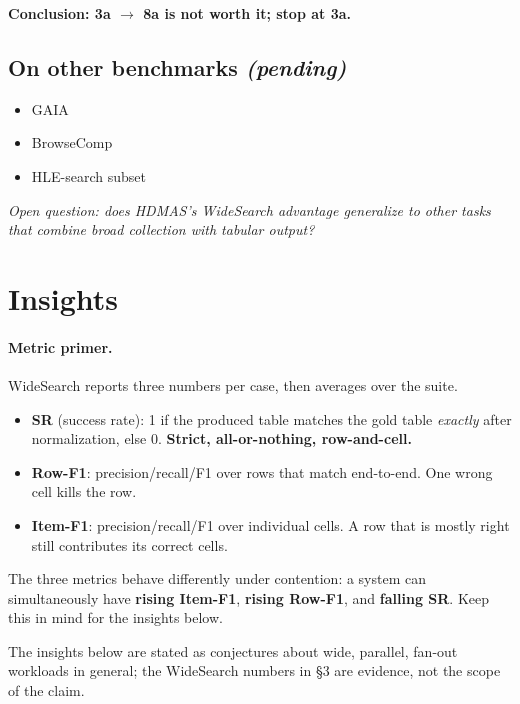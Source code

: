 \documentclass[11pt]{article}
\begin{document}
\textbf{Conclusion: 3a $\to$ 8a is not worth it; stop at 3a.}

\subsection{On other benchmarks \emph{(pending)}}

\begin{itemize}[leftmargin=1.2em]
  \item[$\square$] GAIA
  \item[$\square$] BrowseComp
  \item[$\square$] HLE-search subset
\end{itemize}

\noindent\emph{Open question: does HDMAS's WideSearch advantage generalize to other tasks that combine broad collection with tabular output?}

\section{Insights}

\paragraph{Metric primer.} WideSearch reports three numbers per case, then averages over the suite.
\begin{itemize}[leftmargin=1.2em]
  \item \textbf{SR} (success rate): 1 if the produced table matches the gold table \emph{exactly} after normalization, else 0. \textbf{Strict, all-or-nothing, row-and-cell.}
  \item \textbf{Row-F1}: precision/recall/F1 over rows that match end-to-end. One wrong cell kills the row.
  \item \textbf{Item-F1}: precision/recall/F1 over individual cells. A row that is mostly right still contributes its correct cells.
\end{itemize}
The three metrics behave differently under contention: a system can simultaneously have \textbf{rising Item-F1}, \textbf{rising Row-F1}, and \textbf{falling SR}. Keep this in mind for the insights below.

The insights below are stated as conjectures about wide, parallel, fan-out workloads in general; the WideSearch numbers in \S3 are evidence, not the scope of the claim.
\end{document}
